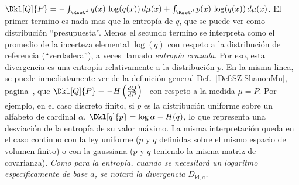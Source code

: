 $\Dkl[Q]{P} =  - \int_{\Rset^d} q(x)  \, \log(q(x)) \, d\mu(x)  + \int_{\Rset^d}
p(x) \, \log(q(x)) \, d\mu(x)$.  El primer termino es nada mas que la entrop\'ia
de $q$, que  se puede ver como distribuci\'on  ``presupuesta''. Menos el secundo
termino se interpreta  como el promedio de la  incerteza elemental $\log(q)$ con
respeto a la distribuci\'on de  referencia (``verdadera''), a veces llamado {\it
  entrop\'ia   cruzada}.   Por   eso,   esta  divergencia   es  una   entrop\'ia
relativamente  a   la  distribuci\'on  $p$.    En  la  misma  linea,   se  puede
inmediatamente  ver  de   la  definici\'on  general  Def.~\ref{Def:SZ:ShanonMu},
pagina~\pageref{Def:SZ:ShanonMu}, que  $\Dkl[Q]{P} \equiv -H\left( \frac{dQ}{dP}
\right)$ \ con respeto a la medida  $\mu = P$.  Por ejemplo, en el caso discreto
finito,  si $p$  es la  distribuci\'on uniforme  sobre un  alfabeto  de cardinal
$\alpha$, $\Dkl[q]{p} = \log \alpha  - H(q)$, lo que representa una desviaci\'on
de la  entrop\'ia de su  valor m\'aximo. La  misma interpretaci\'on queda  en el
caso continuo con la ley uniforme ($p$ y $q$ definidas sobre el mismo espacio de
volumen  finito) o  con la  gaussiana ($p$  y $q$  teniendo la  misma  matriz de
covarianza).  {\it Como para la  entrop\'ia, cuando se necesitar\'a un logaritmo
  especificamente de base $a$, se notar\'a la divergencia $D_{\mathrm{kl},a}$.}


